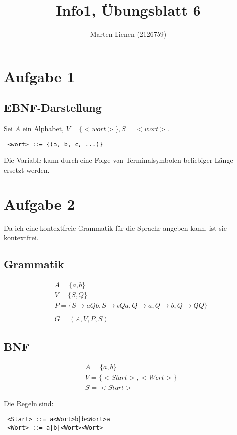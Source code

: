 \documentclass[a4paper,10pt]{article}
\title{Info1, Übungsblatt 6}
\author{Marten Lienen (2126759)}
\begin{document}
\maketitle

\section*{Aufgabe 1}

\subsection*{EBNF-Darstellung}

Sei $A$ ein Alphabet, $V = \{<wort>\}, S = <wort>$.
\begin{lstlisting}
 <wort> ::= {(a, b, c, ...)}
\end{lstlisting}
Die Variable kann durch eine Folge von Terminalsymbolen beliebiger Länge ersetzt werden.

\section*{Aufgabe 2}

Da ich eine kontextfreie Grammatik für die Sprache angeben kann, ist sie kontextfrei.

\subsection*{Grammatik}

\begin{align*}
 & A = \{a, b\}\\
 & V = \{S, Q\}\\
 & P = \{S \rightarrow aQb, S \rightarrow bQa, Q \rightarrow a, Q \rightarrow b, Q \rightarrow QQ\}\\
 \\
 & G = (A, V, P, S)
\end{align*}

\subsection*{BNF}

\begin{align*}
 & A = \{a, b\}\\
 & V = \{<Start>, <Wort>\}\\
 & S = <Start>
\end{align*}

Die Regeln sind:
\begin{lstlisting}
 <Start> ::= a<Wort>b|b<Wort>a
 <Wort> ::= a|b|<Wort><Wort>
\end{lstlisting}
\end{document}
